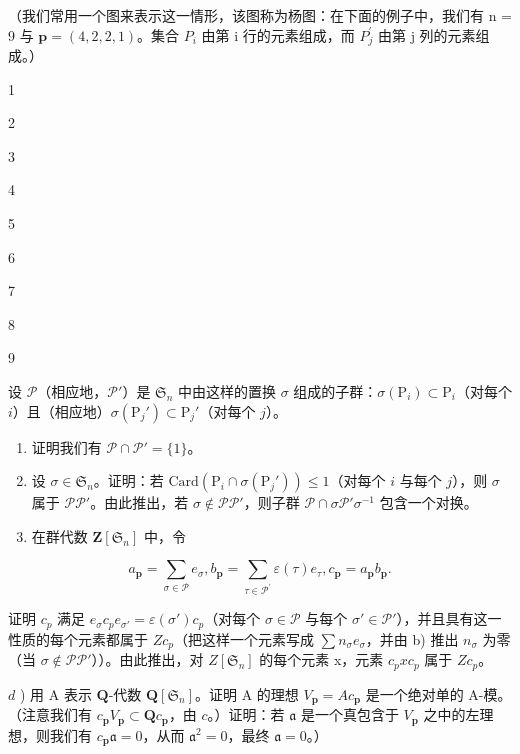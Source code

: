 （我们常用一个图来表示这一情形，该图称为杨图：在下面的例子中，我们有 n = 9 与 \(\mathbf{p} = (4, 2, 2, 1)\)。集合 \(P_{i}\) 由第 i 行的元素组成，而 \(P_{j}^{\prime}\) 由第 j 列的元素组成。）

1

2

3

4

5

6

7

8

9

设 \(\mathcal{P}\)（相应地，\(\mathcal{P}'\)）是 \(\mathfrak{S}_n\) 中由这样的置换 \(\sigma\) 组成的子群：\(\sigma(\mathrm{P}_i) \subset \mathrm{P}_i\)（对每个 \(i\)）且（相应地）\(\sigma(\mathrm{P}_j') \subset \mathrm{P}_j'\)（对每个 \(j\)）。

\begin{enumerate}
\def\labelenumi{\alph{enumi})}
\item
  证明我们有 \(\mathcal{P} \cap \mathcal{P}' = \{1\}\)。
\item
  设 \(\sigma \in \mathfrak{S}_n\)。证明：若 \(\mathrm{Card}(\mathrm{P}_i \cap \sigma(\mathrm{P}_j')) \leqslant 1\)（对每个 \(i\) 与每个 \(j\)），则 \(\sigma\) 属于 \(\mathcal{PP}'\)。由此推出，若 \(\sigma \notin \mathcal{PP}'\)，则子群 \(\mathcal{P} \cap \sigma \mathcal{P}'\sigma^{-1}\) 包含一个对换。
\item
  在群代数 \(\mathbf{Z}[\mathfrak{S}_n]\) 中，令
\end{enumerate}

\[
a _ {\mathbf {p}} = \sum_ {\sigma \in \mathcal {P}} e _ {\sigma}, b _ {\mathbf {p}} = \sum_ {\tau \in \mathcal {P} ^ {\prime}} \varepsilon (\tau) e _ {\tau}, c _ {\mathbf {p}} = a _ {\mathbf {p}} b _ {\mathbf {p}}.
\]

证明 \(c_{p}\) 满足 \(e_{\sigma}c_{p}e_{\sigma'}=\varepsilon(\sigma')c_{p}\)（对每个 \(\sigma\in \mathcal{P}\) 与每个 \(\sigma'\in \mathcal{P}'\)），并且具有这一性质的每个元素都属于 \(Zc_{p}\)（把这样一个元素写成 \(\sum n_{\sigma}e_{\sigma}\)，并由 b) 推出 \(n_{\sigma}\) 为零（当 \(\sigma\notin \mathcal{P}\mathcal{P}'\)））。由此推出，对 \(Z[\mathfrak{S}_n]\) 的每个元素 x，元素 \(c_{p}xc_{p}\) 属于 \(Zc_{p}\)。

\(d\) ) 用 A 表示 \(\mathbf{Q}\)-代数 \(\mathbf{Q}[\mathfrak{S}_n]\)。证明 A 的理想 \(V_{\mathbf{p}} = Ac_{\mathbf{p}}\) 是一个绝对单的 A-模。（注意我们有 \(c_{\mathbf{p}}V_{\mathbf{p}} \subset \mathbf{Q}c_{\mathbf{p}}\)，由 \(c\)。）证明：若 \(\mathfrak{a}\) 是一个真包含于 \(V_{\mathbf{p}}\) 之中的左理想，则我们有 \(c_{\mathbf{p}}\mathfrak{a} = 0\)，从而 \(\mathfrak{a}^2 = 0\)，最终 \(\mathfrak{a} = 0\)。）

